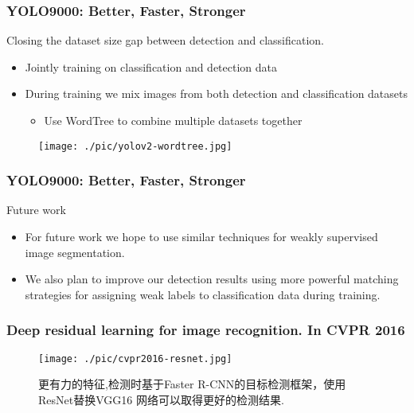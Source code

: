 \documentclass{beamer}
\begin{document}
\begin{frame}
  \frametitle{YOLO9000: Better, Faster, Stronger}
  
  Closing the dataset size gap between detection and classification.
  \begin{itemize}
  \item Jointly training on classification and detection data
  \item During training we mix images from both detection and classification datasets
    \begin{itemize}
    \item Use WordTree to combine multiple datasets together
    \end{itemize}
  \end{itemize}
  \begin{figure}[!htb]
    \centering
    \texttt{[image: ./pic/yolov2-wordtree.jpg]}
  \end{figure}
\end{frame}

\begin{frame}
  \frametitle{YOLO9000: Better, Faster, Stronger}  

  Future work
  \begin{itemize}
  \item For future work we hope to use similar techniques for weakly supervised
    image segmentation.
  \item We also plan to improve our detection results using more powerful matching
    strategies for assigning weak labels to classification data during training.
  \end{itemize}
\end{frame}

\begin{frame}
  \frametitle{Deep residual learning for image recognition. In CVPR 2016}

  \begin{figure}[ht]
    \centering
    \begin{minipage}{.5\textwidth}
      \centering
      \texttt{[image: ./pic/cvpr2016-resnet.jpg]}
    \end{minipage}%
    \begin{minipage}{.5\textwidth}
      更有力的特征,检测时基于Faster R-CNN的目标检测框架，使用ResNet替换VGG16
      网络可以取得更好的检测结果.
    \end{minipage}
  \end{figure}


\end{frame}
\end{document}

